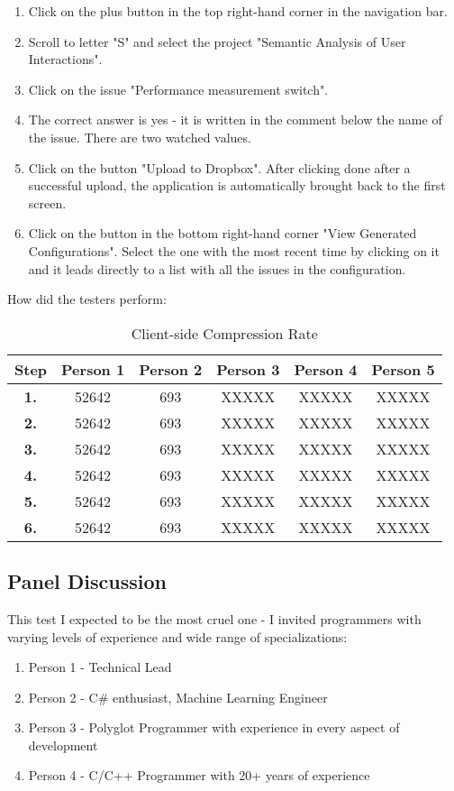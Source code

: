 \begin{enumerate}
	\item Click on the plus button in the top right-hand corner in the navigation bar.
	\item Scroll to letter "S" and select the project "Semantic Analysis of User Interactions".
	\item Click on the issue "Performance measurement switch".
	\item The correct answer is yes - it is written in the comment below the name of the issue. There are two watched values.
	\item Click on the button "Upload to Dropbox". After clicking done after a successful upload, the application is automatically brought back to the first screen.
	\item Click on the button in the bottom right-hand corner "View Generated Configurations". Select the one with the most recent time by clicking on it and it leads directly to a list with all the issues in the configuration.
\end{enumerate}

How did the testers perform:

\begin{table}[!ht]
\begin{center}
\begin{tabular}{|c|c|c|c|c|c|}
\hline
\textbf{Step} & \textbf{Person 1} & \textbf{Person 2} & \textbf{Person 3} & \textbf{Person 4} & \textbf{Person 5} \\
\hline
\textbf{1.} & 52642 & 693 & XXXXX & XXXXX & XXXXX \\
\hline
\textbf{2.} & 52642 & 693 & XXXXX & XXXXX & XXXXX \\
\hline
\textbf{3.} & 52642 & 693 & XXXXX & XXXXX & XXXXX \\
\hline
\textbf{4.} & 52642 & 693 & XXXXX & XXXXX & XXXXX \\
\hline
\textbf{5.} & 52642 & 693 & XXXXX & XXXXX & XXXXX \\
\hline
\textbf{6.} & 52642 & 693 & XXXXX & XXXXX & XXXXX \\
\hline
\end{tabular}
\end{center}
\caption{Client-side Compression Rate}
\label{tab:ex_db}
\end{table}

\subsection{Panel Discussion}

This test I expected to be the most cruel one - I invited programmers with varying levels of experience and wide range of specializations:

\begin{enumerate}
	\item Person 1 - Technical Lead
	\item Person 2 - C\# enthusiast, Machine Learning Engineer
	\item Person 3 - Polyglot Programmer with experience in every aspect of development
	\item Person 4 - C/C++ Programmer with 20+ years of experience
\end{enumerate}